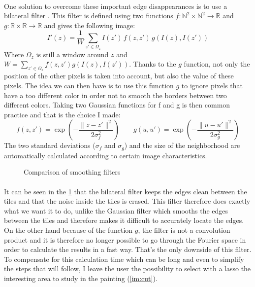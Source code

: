 \documentclass[11pt]{article}
\newcommand{\N}{\mathbb{N}}
\newcommand{\R}{\mathbb{R}}
\begin{document}
	\paragraph{}
	One solution to overcome these important edge disappearances is to use a bilateral filter \cite{bil}. This filter is defined using two functions $f: \N^2 \times \N^2 \rightarrow \R$ and $g: \R \times \R \rightarrow \R$ and gives the following image:
	$$ I'(z) = \dfrac{1}{W} \sum_{z' \in \Omega_{z}} I(z') \, f(z, z') \, g \left( I(z), I(z') \right) $$
	Where $\Omega_{z}$ is still a window around $z$ and $W = \sum_{z' \in \Omega_{z}} f(z, z') g(I(z), I(z'))$. Thanks to the $g$ function, not only the position of the other pixels is taken into account, but also the value of these pixels. The idea we can then have is to use this function $g$ to ignore pixels that have a too different color in order not to smooth the borders between two different colors. Taking two Gaussian functions for f and g is then common practice and that is the choice I made:
	$$ f(z, z') = \exp \left( - \dfrac{\| z - z'\|^2}{2 \sigma_f^2} \right) \qquad g(u, u') = \exp \left( - \dfrac{\| u - u'\|^2}{2 \sigma_g^2} \right) $$
	The two standard deviations ($\sigma_f$ and $\sigma_g$) and the size of the neighborhood are automatically calculated according to certain image characteristics.
	
	\begin{figure}[h]
		\centering
		\vspace{-1mm}
		\caption{Comparison of smoothing filters}
		\label{im:smooths}
	\end{figure}
	\vspace{-1mm}

	\paragraph{}
	It can be seen in the \figurename \ref{im:smooths} that the bilateral filter keeps the edges clean between the tiles and that the noise inside the tiles is erased. This filter therefore does exactly what we want it to do, unlike the Gaussian filter which smooths the edges between the tiles and therefore makes it difficult to accurately locate the edges. On the other hand because of the function $g$, the filter is not a convolution product and it is therefore no longer possible to go through the Fourier space in order to calculate the results in a fast way. That's the only downside of this filter. To compensate for this calculation time which can be long and even to simplify the steps that will follow, I leave the user the possibility to select with a lasso the interesting area to study in the painting (\figurename \ref{im:cut}).
	
\end{document}
